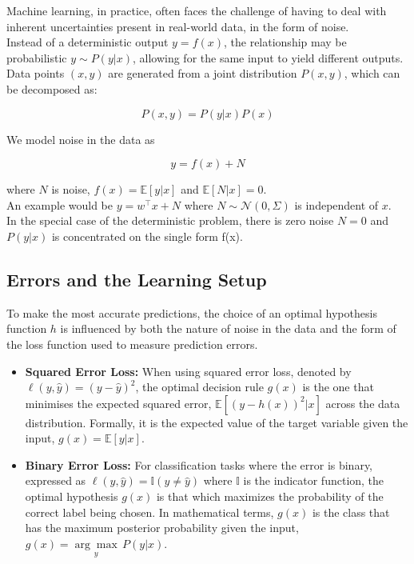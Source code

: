 Machine learning, in practice, often faces the challenge of having to deal with inherent uncertainties present in real-world data, in the form of noise. \\

Instead of a deterministic output \( y = f(x) \), the relationship may be probabilistic \( y \sim P(y|x) \), allowing for the same input to yield different outputs.\\

Data points \( (x, y) \) are generated from a joint distribution \( P(x, y) \), which can be decomposed as:

$$ P(x,y) = P(y|x)P(x) $$


We model noise in the data as 

$$ y = f(x) + N $$

where $N$ is noise, $f(x) = \mathbb{E}[y|x]$  and $\mathbb{E}[N|x] = 0$. \\

An example would be $y=w^\top x + N$ where $N \sim \mathcal{N}(0, \Sigma)$ is independent of $x$. \\

In the special case of the deterministic problem, there is zero noise $N= 0$ and $P(y|x)$ is concentrated on the single form f(x).

\subsection{Errors and the Learning Setup}

To make the most accurate predictions, the choice of an optimal hypothesis function \( h \) is influenced by both the nature of noise in the data and the form of the loss function used to measure prediction errors.

\begin{itemize}
    \item \textbf{Squared Error Loss:} When using squared error loss, denoted by \( \ell(y, \widehat{y}) = (y - \widehat{y})^2 \), the optimal decision rule \( g(x) \) is the one that minimises the expected squared error, $\mathbb{E}[(y-h(x))^2|x]$ across the data distribution. Formally, it is the expected value of the target variable given the input, \( g(x) = \mathbb{E}[y|x] \).
    
    \item \textbf{Binary Error Loss:} For classification tasks where the error is binary, expressed as \( \ell(y, \widehat{y}) = \mathbb{I}(y \neq \widehat{y}) \) where \( \mathbb{I} \) is the indicator function, the optimal hypothesis \( g(x) \) is that which maximizes the probability of the correct label being chosen. In mathematical terms, \( g(x) \) is the class that has the maximum posterior probability given the input, \( g(x) = \underset{y}{\arg\max}\, P(y|x) \).
\end{itemize}

